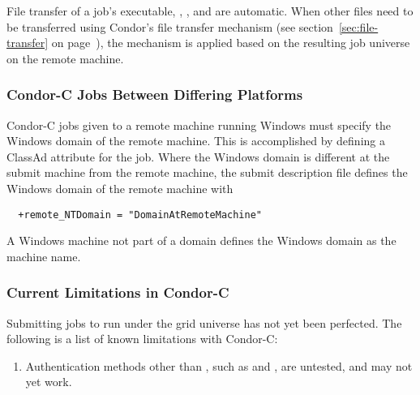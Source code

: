 File transfer of a job's executable, , , and
 are automatic.
When other files need to be transferred using Condor's file transfer
mechanism
(see section~\ref{sec:file-transfer} on page~\pageref{sec:file-transfer}),
the mechanism is applied based on the resulting job universe on the
remote machine.


\subsubsection{\label{sec:Condor-C-CrossPlatform}
Condor-C Jobs Between Differing Platforms}

Condor-C jobs given to a remote machine running Windows
must specify the Windows domain of the remote machine.
This is accomplished by defining a ClassAd attribute for the job.
Where the Windows domain is different at the submit machine
from the remote machine, the submit description file 
defines the Windows domain of the remote machine with
\begin{verbatim}
  +remote_NTDomain = "DomainAtRemoteMachine"
\end{verbatim}

A Windows machine not part of a domain
defines the Windows domain as the machine name.

%

\subsubsection{\label{sec:Condor-C-Limits}Current Limitations in Condor-C}
Submitting jobs to run under the grid universe has not yet
been perfected.
The following is a list of known limitations with Condor-C:

\begin{enumerate}
  \item{Authentication methods other than
  , such as  and , are 
  untested, and may not yet work.}

\end{enumerate}



